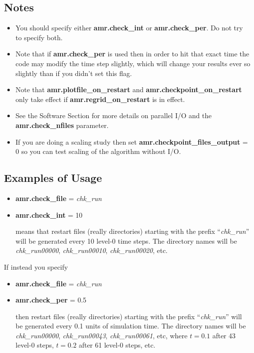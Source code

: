 \subsection{Notes}

\begin{itemize}

\item You should specify either {\bf amr.check\_int} or {\bf amr.check\_per}.  Do not try to specify both. 

\item Note that if {\bf amr.check\_per} is used then in order to hit that exact time the code 
may modify the time step slightly, which will change your results ever so slightly than if 
you didn't set this flag.

\item Note that {\bf amr.plotfile\_on\_restart} and {\bf amr.checkpoint\_on\_restart} 
only take effect if {\bf amr.regrid\_on\_restart} is in effect.

\item See the Software Section for more details on parallel I/O and the 
{\bf amr.check\_nfiles} parameter.

\item If you are doing a scaling study then set {\bf amr.checkpoint\_files\_output} = 0
so you can test scaling of the algorithm without I/O.

\end{itemize}

\subsection{Examples of Usage}

\begin{itemize}

\item {\bf amr.check\_file} = {\em chk\_run}
\item {\bf amr.check\_int} = 10

means that restart files (really directories) starting with the prefix
``{\em chk\_run}'' will be
generated every 10 level-0 time steps.  The directory names will be {\em chk\_run00000}, 
{\em chk\_run00010}, {\em chk\_run00020}, etc.

\end{itemize}

If instead you specify

\begin{itemize}

\item {\bf amr.check\_file} = {\em chk\_run}
\item {\bf amr.check\_per} = 0.5

then restart files (really directories) starting with the prefix
``{\em chk\_run}'' will be
generated every 0.1 units of simulation time.  The directory names will be {\em chk\_run00000}, 
{\em chk\_run00043}, {\em chk\_run00061}, etc, where $t = 0.1$ after 43 level-0 steps, 
$t = 0.2$ after 61 level-0 steps, etc.

\end{itemize}

